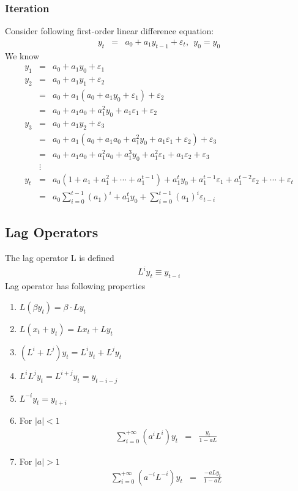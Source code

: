 \subsubsection{Iteration}
Consider following first-order linear difference equation:
\begin{eqnarray*}
y_{t}&=&a_{0}+a_{1}y_{t-1}+\varepsilon_{t}, \ \ y_{0}=y_{0}
\end{eqnarray*}
We know 
\begin{eqnarray*}
y_{1}&=&a_{0}+a_{1}y_{0}+\varepsilon_{1}\\
y_{2}&=&a_{0}+a_{1}y_{1}+\varepsilon_{2}\\
	&=&a_{0}+a_{1}(a_{0}+a_{1}y_{0}+\varepsilon_{1})+\varepsilon_{2}\\
	&=&a_{0}+a_{1}a_{0}+a_{1}^{2}y_{0}+a_{1}\varepsilon_{1}+\varepsilon_{2}\\
y_{3}&=&a_{0}+a_{1}y_{2}+\varepsilon_{3}\\
	&=&a_{0}+a_{1}(a_{0}+a_{1}a_{0}+a_{1}^{2}y_{0}+a_{1}\varepsilon_{1}+\varepsilon_{2})+\varepsilon_{3}\\
	&=&a_{0}+a_{1}a_{0}+a_{1}^{2}a_{0}+a_{1}^{3}y_{0}+a_{1}^{2}\varepsilon_{1}+a_{1}\varepsilon_{2}+\varepsilon_{3}\\
	&\vdots&\\
y_{t}&=&a_{0}(1+a_{1}+a_{1}^{2}+\cdots+a_{1}^{t-1})+a_{1}^{t}y_{0}+a_{1}^{t-1}\varepsilon_{1}+a_{1}^{t-2}\varepsilon_{2}+\cdots+\varepsilon_{t}\\
&=&a_{0}\sum_{i=0}^{t-1}(a_{1})^{i}+a_{1}^{t}y_{0}+\sum_{i=0}^{t-1}(a_{1})^{i}\varepsilon_{t-i}
\end{eqnarray*}

\subsection{Lag Operators}
The lag operator L is defined 
\begin{eqnarray*}
L^{i}y_{t}\equiv y_{t-i}
\end{eqnarray*}
Lag operator has following properties
\begin{enumerate}
\item $L(\beta y_{t})=\beta\cdot Ly_{t}$
\item $L(x_{t}+y_{t})=Lx_{t}+Ly_{t}$
\item $(L^{i}+L^{j})y_{t}=L^{i}y_{t}+L^{j}y_{t}$
\item $L^{i}L^{j}y_{t}=L^{i+j}y_{t}=y_{t-i-j}$
\item $L^{-i}y_{t}=y_{t+i}$
\item For $\left |a\right|<1$
\begin{eqnarray*}
\sum_{i=0}^{+\infty}(a^{i}L^{i})y_{t}&=&\frac{y_{t}}{1-aL}
\end{eqnarray*}
\item For $\left |a\right|>1$
\begin{eqnarray*}
\sum_{i=0}^{+\infty}(a^{-i}L^{-i})y_{t}&=&\frac{-aLy_{t}}{1-aL}
\end{eqnarray*}
\end{enumerate}


